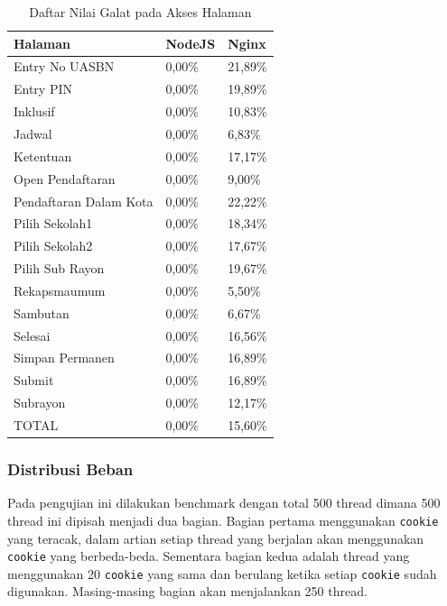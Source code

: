 \documentclass{ta-its}
\begin{document}
					\begin{longtable}{|p{}|p{0.2\textwidth}|p{}|} %
						
						\caption{Daftar Nilai Galat pada Akses Halaman} \label{tabelGalat} \\
						\hline
						\textbf{Halaman} & \textbf{NodeJS} & \textbf{Nginx} \\ \hline
						
						\endhead
						\endfoot
						\endlastfoot
						
						Entry No UASBN & 0,00\% & 21,89\% \\ \hline
						Entry PIN & 0,00\% & 19,89\% \\ \hline
						Inklusif & 0,00\% & 10,83\% \\ \hline
						Jadwal & 0,00\% & 6,83\% \\ \hline
						Ketentuan & 0,00\% & 17,17\% \\ \hline
						Open Pendaftaran & 0,00\% & 9,00\% \\ \hline
						Pendaftaran Dalam Kota & 0,00\% & 22,22\% \\ \hline
						Pilih Sekolah1 & 0,00\% & 18,34\% \\ \hline
						Pilih Sekolah2 & 0,00\% & 17,67\% \\ \hline
						Pilih Sub Rayon & 0,00\% & 19,67\% \\ \hline
						Rekapsmaumum & 0,00\% & 5,50\% \\ \hline
						Sambutan & 0,00\% & 6,67\% \\ \hline
						Selesai & 0,00\% & 16,56\% \\ \hline
						Simpan Permanen & 0,00\% & 16,89\% \\ \hline
						Submit & 0,00\% & 16,89\% \\ \hline
						Subrayon & 0,00\% & 12,17\% \\ \hline
						TOTAL & 0,00\% & 15,60\% \\ \hline
						
					\end{longtable}
				
				\subsubsection{Distribusi Beban}
					Pada pengujian ini dilakukan benchmark dengan total 500 thread dimana 500 thread ini dipisah menjadi dua bagian. Bagian pertama menggunakan \texttt{cookie} yang teracak, dalam artian setiap thread yang berjalan akan menggunakan \texttt{cookie} yang berbeda-beda. Sementara bagian kedua adalah thread yang menggunakan 20 \texttt{cookie} yang sama dan berulang ketika setiap \texttt{cookie} sudah digunakan. Masing-masing bagian akan menjalankan 250 thread. 
					
\end{document}
